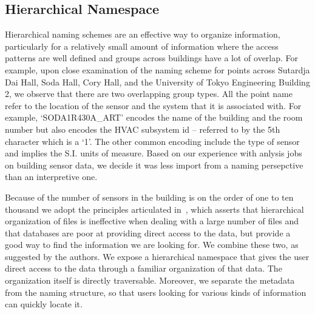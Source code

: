 

\subsection{Hierarchical Namespace}

Hierarchical naming schemes are an effective way to organize information, particularly for a relatively small amount of information
where the access patterns are well defined and groups across buildings have a lot of overlap.  For example, upon close examination of
the naming scheme for points across Sutardja Dai Hall, Soda Hall, Cory Hall, and the University of Tokyo Engineering Building 2, we 
observe that there are two overlapping group types.  All the point name refer to the location of the sensor and the system that it is 
associated with.  For example, `SODA1R430A\_ART' encodes the name of the building and the room number but also encodes the HVAC subsystem id --
referred to by the 5th character which is a `1'.  The other common encoding include the type of sensor and implies the S.I. units of measure.
Based on our experience with anlysis jobs on building sensor data, we decide it was less import from a naming persepctive than 
an interpretive one.

Because of the number of sensors in the building is on the order of one to ten thousand we adopt the principles articulated 
in~\cite{hierarchy_is_dead}, which asserts that hierarchical organization of files is ineffective when dealing with a large number of files
and that databases are poor at providing direct access to the data, but provide a good way to find the information we are looking for.
We combine these two, as suggested by the authors.  We expose a hierarchical namespace that gives the user direct access to the data
through a familiar organization of that data.  The organization itself is directly traversable.  Moreover, we separate the metadata from
the naming structure, so that users looking for various kinds of information can quickly locate it.

